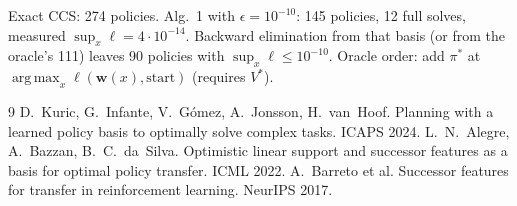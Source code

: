 \documentclass[11pt]{article}
\newcommand{\w}{\mathbf{w}}
\DeclareMathOperator*{\argmax}{arg\,max}
\theoremstyle{definition}
\begin{document}
\noindent Exact CCS: 274 policies. Alg.~1 with $\epsilon=10^{-10}$: 145 policies, 12 full solves, measured
$\sup_x\ell=4\cdot10^{-14}$. Backward elimination from that basis (or from the oracle's 111) leaves 90
policies with $\sup_x\ell\le10^{-10}$. Oracle order: add $\pi^*$ at $\argmax_x\ell(\w(x),\text{start})$ (requires $V^*$).

\begin{thebibliography}{9}
 D.~Kuric, G.~Infante, V.~G\'omez, A.~Jonsson, H.~van~Hoof. Planning with a learned policy
basis to optimally solve complex tasks. ICAPS 2024.
 L.~N.~Alegre, A.~Bazzan, B.~C.~da~Silva. Optimistic linear support and successor features
as a basis for optimal policy transfer. ICML 2022.
 A.~Barreto et al. Successor features for transfer in reinforcement learning. NeurIPS 2017.
\end{thebibliography}
\end{document}
